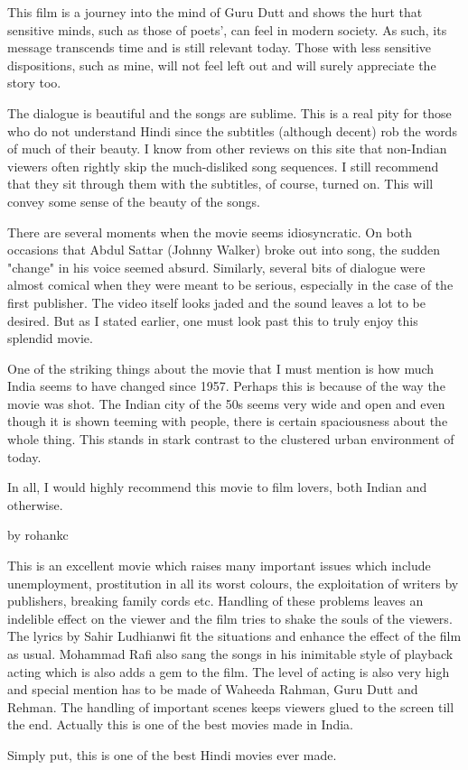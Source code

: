 \documentclass{article}
\begin{document}
This film is a journey into the mind of Guru Dutt and shows the hurt that sensitive minds, such as those of poets', can feel in modern society. As such, its message transcends time and is still relevant today. Those with less sensitive dispositions, such as mine, will not feel left out and will surely appreciate the story too.

The dialogue is beautiful and the songs are sublime. This is a real pity for those who do not understand Hindi since the subtitles (although decent) rob the words of much of their beauty. I know from other reviews on this site that non-Indian viewers often rightly skip the much-disliked song sequences. I still recommend that they sit through them with the subtitles, of course, turned on. This will convey some sense of the beauty of the songs.

There are several moments when the movie seems idiosyncratic. On both occasions that Abdul Sattar (Johnny Walker) broke out into song, the sudden "change" in his voice seemed absurd. Similarly, several bits of dialogue were almost comical when they were meant to be serious, especially in the case of the first publisher. The video itself looks jaded and the sound leaves a lot to be desired. But as I stated earlier, one must look past this to truly enjoy this splendid movie.

One of the striking things about the movie that I must mention is how much India seems to have changed since 1957. Perhaps this is because of the way the movie was shot. The Indian city of the 50s seems very wide and open and even though it is shown teeming with people, there is certain spaciousness about the whole thing. This stands in stark contrast to the clustered urban environment of today.

In all, I would highly recommend this movie to film lovers, both Indian and otherwise.

by rohankc


This is an excellent movie which raises many important issues which include unemployment, prostitution in all its worst colours, the exploitation of writers by publishers, breaking family cords etc. Handling of these problems leaves an indelible effect on the viewer and the film tries to shake the souls of the viewers. The lyrics by Sahir Ludhianwi fit the situations and enhance the effect of the film as usual. Mohammad Rafi also sang the songs in his inimitable style of playback acting which is also adds a gem to the film. The level of acting is also very high and special mention has to be made of Waheeda Rahman, Guru Dutt and Rehman. The handling of important scenes keeps viewers glued to the screen till the end. Actually this is one of the best movies made in India. 


Simply put, this is one of the best Hindi movies ever made.
\end{document}
